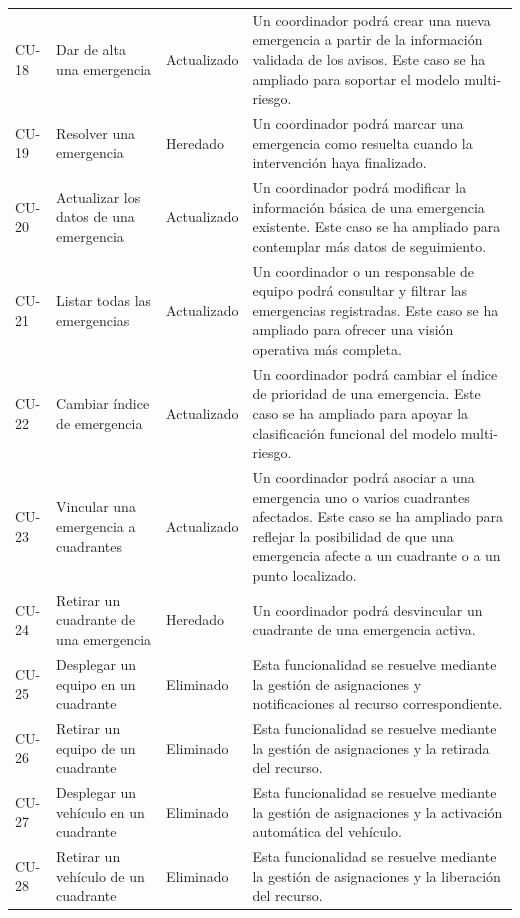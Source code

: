 \begin{longtable}{ p{2cm}| p{3cm}| p{2cm}| p{5.5cm} }
  CU-18 & Dar de alta una emergencia & Actualizado & Un coordinador podrá crear una nueva emergencia a partir de la información validada de los avisos. Este caso se ha ampliado para soportar el modelo multi-riesgo. \\
  CU-19 & Resolver una emergencia & Heredado & Un coordinador podrá marcar una emergencia como resuelta cuando la intervención haya finalizado. \\
  CU-20 & Actualizar los datos de una emergencia & Actualizado & Un coordinador podrá modificar la información básica de una emergencia existente. Este caso se ha ampliado para contemplar más datos de seguimiento. \\
  CU-21 & Listar todas las emergencias & Actualizado & Un coordinador o un responsable de equipo podrá consultar y filtrar las emergencias registradas. Este caso se ha ampliado para ofrecer una visión operativa más completa. \\
  CU-22 & Cambiar índice de emergencia & Actualizado & Un coordinador podrá cambiar el índice de prioridad de una emergencia. Este caso se ha ampliado para apoyar la clasificación funcional del modelo multi-riesgo. \\
  CU-23 & Vincular una emergencia a cuadrantes & Actualizado & Un coordinador podrá asociar a una emergencia uno o varios cuadrantes afectados. Este caso se ha ampliado para reflejar la posibilidad de que una emergencia afecte a un cuadrante o a un punto localizado. \\
  CU-24 & Retirar un cuadrante de una emergencia & Heredado & Un coordinador podrá desvincular un cuadrante de una emergencia activa.  \\
  CU-25 & Desplegar un equipo en un cuadrante & Eliminado & Esta funcionalidad se resuelve mediante la gestión de asignaciones y notificaciones al recurso correspondiente. \\
  CU-26 & Retirar un equipo de un cuadrante & Eliminado & Esta funcionalidad se resuelve mediante la gestión de asignaciones y la retirada del recurso. \\
  CU-27 & Desplegar un vehículo en un cuadrante & Eliminado & Esta funcionalidad se resuelve mediante la gestión de asignaciones y la activación automática del vehículo. \\
  CU-28 & Retirar un vehículo de un cuadrante & Eliminado & Esta funcionalidad se resuelve mediante la gestión de asignaciones y la liberación del recurso. \\
\end{longtable}
